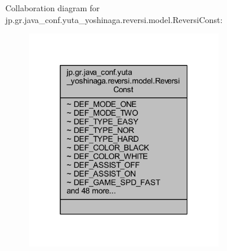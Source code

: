 Collaboration diagram for jp.\+gr.\+java\+\_\+conf.\+yuta\+\_\+yoshinaga.\+reversi.\+model.\+Reversi\+Const\+:
\nopagebreak
\begin{figure}[H]
\begin{center}
\leavevmode
\includegraphics[width=241pt]{classjp_1_1gr_1_1java__conf_1_1yuta__yoshinaga_1_1reversi_1_1model_1_1_reversi_const__coll__graph}
\end{center}
\end{figure}
